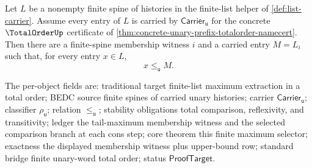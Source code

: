 \begin{theorem}
\label{thm:totalorder-prefix-finite-maximum-index-selector}
Let $L$ be a nonempty finite spine of histories in the finite-list helper of
\autoref{def:list-carrier}. Assume every entry of $L$ is carried by
$\mathsf{Carrier}_{\mathsf{u}}$ for the concrete $\TotalOrderUp$ certificate of
\autoref{thm:concrete-unary-prefix-totalorder-namecert}. Then there are a
finite-spine membership witness $i$ and a carried entry $M=L_i$ such that, for
every entry $x\in L$,
$$
x\le_{\mathsf{u}}M.
$$

The per-object fields are: traditional target finite-list maximum extraction in
a total order; BEDC source finite spines of carried unary histories; carrier
$\mathsf{Carrier}_{\mathsf{u}}$; classifier $\rho_{\mathsf{u}}$; relation
$\le_{\mathsf{u}}$; stability obligations total comparison, reflexivity, and
transitivity; ledger the tail-maximum membership witness and the selected
comparison branch at each cons step; core theorem this finite maximum selector;
exactness the displayed membership witness plus upper-bound row; standard
bridge finite unary-word total order; status $\mathsf{ProofTarget}$.
\end{theorem}
